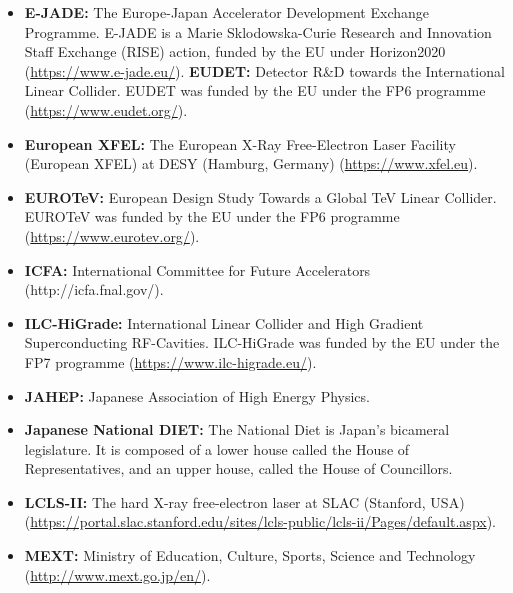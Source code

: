 \documentclass[%
 reprint,
 floatfix,
 amsmath,amssymb,
 aps,
]{revtex4-1}
\begin{document}
\begin{itemize}
\item
\textbf{E-JADE:} The Europe-Japan Accelerator Development Exchange Programme. E-JADE is a Marie Sklodowska-Curie Research and Innovation Staff Exchange (RISE) action, funded by the EU under Horizon2020 (\url{https://www.e-jade.eu/}).
\textbf{EUDET:} Detector R\&D towards the International Linear Collider. EUDET was funded by the EU under the FP6 programme (\url{https://www.eudet.org/}).
\item
\textbf{European XFEL:} The European X-Ray Free-Electron Laser Facility (European XFEL) at DESY (Hamburg, Germany) (\url{https://www.xfel.eu}).
\item
\textbf{EUROTeV:} European Design Study Towards a Global TeV Linear Collider. EUROTeV was funded by the EU under the FP6 programme (\url{https://www.eurotev.org/}).
\item
\textbf{ICFA:} International Committee for Future Accelerators (http://icfa.fnal.gov/).
\item
\textbf{ILC-HiGrade:} International Linear Collider and High Gradient Superconducting RF-Cavities. ILC-HiGrade was funded by the EU under the FP7 programme (\url{https://www.ilc-higrade.eu/}).
\item
\textbf{JAHEP:} Japanese Association of High Energy Physics.
\item
\textbf{Japanese National DIET:} The National Diet is Japan's bicameral legislature. It is composed of a lower house called the House of Representatives, and an upper house, called the House of Councillors.
\item
\textbf{LCLS-II:}  The hard X-ray free-electron laser at SLAC (Stanford, USA)(\url{https://portal.slac.stanford.edu/sites/lcls-public/lcls-ii/Pages/default.aspx}).
\item
\textbf{MEXT:} Ministry of Education, Culture, Sports, Science and Technology (\url{http://www.mext.go.jp/en/}).
\end{itemize}
\end{document}
